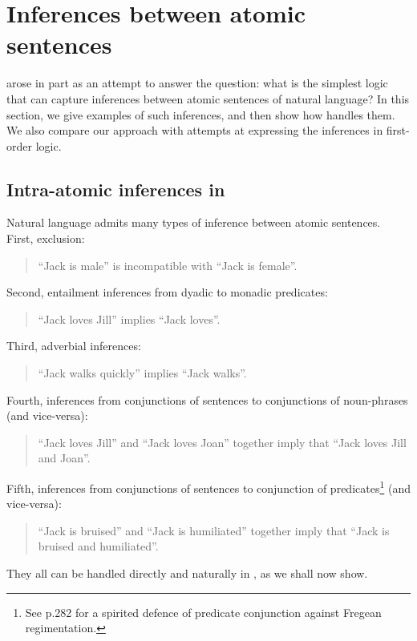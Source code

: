 
\section{Inferences between atomic sentences}\label{naturalLanguageInference}

\NI \Cathoristic{} arose in part as an attempt to answer the
question: what is the simplest logic that can capture inferences
between atomic sentences of natural language?  In this section, we
give examples of such inferences, and then show how \cathoristic{}
handles them.  We also compare our approach with attempts at
expressing the inferences in first-order logic.

\subsection{Intra-atomic inferences in \cathoristic{}}

\NI Natural language admits many types of inference between atomic
sentences.  First, exclusion:
\begin{quote}
``Jack is male'' is incompatible with ``Jack is female''.
\end{quote}
Second, entailment inferences from dyadic to monadic predicates:
\begin{quote}
``Jack loves Jill'' implies ``Jack loves''.
\end{quote}
Third, adverbial inferences:
\begin{quote}
``Jack walks quickly'' implies ``Jack walks''.
\end{quote}
Fourth, inferences from conjunctions of sentences to conjunctions of noun-phrases (and vice-versa):
\begin{quote}
``Jack loves Jill'' and ``Jack loves Joan'' together imply that ``Jack loves Jill and Joan''.
\end{quote}
Fifth, inferences from conjunctions of sentences to conjunction of
predicates\footnote{See \cite{sommers} p.282 for a spirited defence of
  predicate conjunction against Fregean regimentation.} (and
vice-versa):
\begin{quote}
``Jack is bruised'' and ``Jack is humiliated'' together imply that ``Jack is bruised and humiliated''.
\end{quote}

\NI They all can be handled directly and naturally in \cathoristic{}, as we
shall now show.

